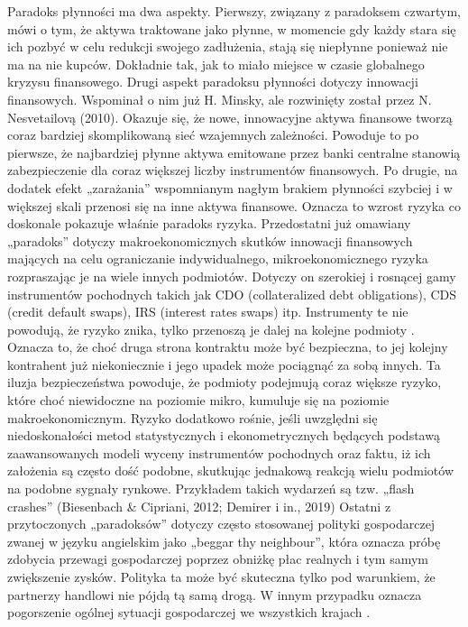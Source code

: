 \documentclass[
]{book}
\begin{document}
Paradoks płynności ma dwa aspekty. Pierwszy, związany z paradoksem czwartym, mówi o tym, że aktywa traktowane jako płynne, w momencie gdy każdy stara się ich pozbyć w celu redukcji swojego zadłużenia, stają się niepłynne ponieważ nie ma na nie kupców. Dokładnie tak, jak to miało miejsce w czasie globalnego kryzysu finansowego. Drugi aspekt paradoksu płynności dotyczy innowacji finansowych. Wspominał o nim już H. Minsky, ale rozwinięty został przez N. Nesvetailovą (2010). Okazuje się, że nowe, innowacyjne aktywa finansowe tworzą coraz bardziej skomplikowaną sieć wzajemnych zależności. Powoduje to po pierwsze, że najbardziej płynne aktywa emitowane przez banki centralne stanowią zabezpieczenie dla coraz większej liczby instrumentów finansowych. Po drugie, na dodatek efekt „zarażania'' wspomnianym nagłym brakiem płynności szybciej i w większej skali przenosi się na inne aktywa finansowe. Oznacza to wzrost ryzyka co doskonale pokazuje właśnie paradoks ryzyka.
Przedostatni już omawiany „paradoks'' dotyczy makroekonomicznych skutków innowacji finansowych mających na celu ograniczanie indywidualnego, mikroekonomicznego ryzyka rozpraszając je na wiele innych podmiotów. Dotyczy on szerokiej i rosnącej gamy instrumentów pochodnych takich jak CDO (collateralized debt obligations), CDS (credit default swaps), IRS (interest rates swaps) itp. Instrumenty te nie powodują, że ryzyko znika, tylko przenoszą je dalej na kolejne podmioty . Oznacza to, że choć druga strona kontraktu może być bezpieczna, to jej kolejny kontrahent już niekoniecznie i jego upadek może pociągnąć za sobą innych. Ta iluzja bezpieczeństwa powoduje, że podmioty podejmują coraz większe ryzyko, które choć niewidoczne na poziomie mikro, kumuluje się na poziomie makroekonomicznym. Ryzyko dodatkowo rośnie, jeśli uwzględni się niedoskonałości metod statystycznych i ekonometrycznych będących podstawą zaawansowanych modeli wyceny instrumentów pochodnych oraz faktu, iż ich założenia są często dość podobne, skutkując jednakową reakcją wielu podmiotów na podobne sygnały rynkowe. Przykładem takich wydarzeń są tzw. „flash crashes'' (Biesenbach \& Cipriani, 2012; Demirer i in., 2019)
Ostatni z przytoczonych „paradoksów'' dotyczy często stosowanej polityki gospodarczej zwanej w języku angielskim jako „beggar thy neighbour'', która oznacza próbę zdobycia przewagi gospodarczej poprzez obniżkę płac realnych i tym samym zwiększenie zysków. Polityka ta może być skuteczna tylko pod warunkiem, że partnerzy handlowi nie pójdą tą samą drogą. W innym przypadku oznacza pogorszenie ogólnej sytuacji gospodarczej we wszystkich krajach .
\end{document}
